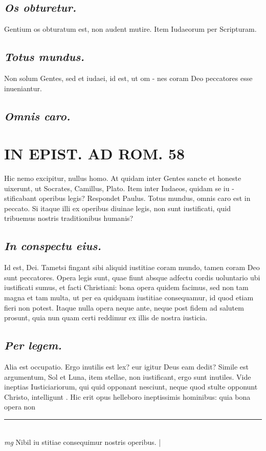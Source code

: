 \documentclass{article}
\begin{document}
\begin{pages}
\subsection*{\textit{Os obturetur. }}\pstart Gentium os obturatum est, non audent mutire.  Item Iudaeorum per Scripturam.  \pend
{}
{}
\subsection*{\textit{Totus mundus. }}\pstart Non solum Gentes, sed et iudaei, id est, ut om - nes coram Deo peccatores esse inueniantur.   \pend
{}
{}
\subsection*{\textit{Omnis caro. }}
\section*{IN EPIST. AD ROM.  58 }
\marginpar{[ p.]}\pstart Hic nemo excipitur, nullus homo. At quidam inter Gentes sancte et honeste uixerunt, ut Socrates, Camillus, Plato. Item inter Iudaeos, quidam se iu - stificabant operibus legis? Respondet Paulus. Totus mundus, omnis caro est in peccato. Si itaque illi ex operibus diuinae legis, non sunt iustificati, quid tribuemus nostris traditionibus humanis?  \pend
{}
{}
\subsection*{\textit{In conspectu eius. }}\pstart Id est, Dei. Tametsi fingant sibi aliquid iustitiae coram mundo, tamen coram Deo sunt peccatores. Opera legis sunt, quae fiunt absque adfectu cordis uoluntario ubi iustificati sumus, et facti Christiani: bona opera quidem facimus, sed non tam magna et tam multa, ut per ea quidquam iustitiae consequamur, id quod etiam fieri non potest. Itaque nulla opera neque  ante, neque post fidem ad salutem prosunt, quia nun quam certi reddimur ex illis de nostra iusticia.   \pend
{}
{}
\subsection*{\textit{Per legem. }}\pstart Alia est occupatio. Ergo inutilis est lex? eur igitur Deus eam dedit? Simile est argumentum, Sol et Luna, item stellae, non iustificant, ergo sunt inutiles. Vide ineptias Iusticiariorum, qui quid opponant nesciunt, neque quod stulte opponunt Christo, intelligunt . Hic erit opus helleboro ineptissimis hominibus: quia bona opera non  \pend
\vspace{0.5cm}\noindent
\vspace{0.2cm}\rule{1cm}{0.2pt}\\ 
\hspace{0.2cm}\textit{mg}
\footnotesize Nibil iu stitiae consequimur nostris operibus.  
\normalsize| 

\end{pages}
\end{document}
